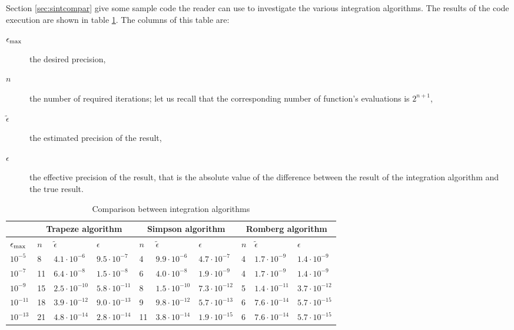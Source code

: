 \documentclass[twoside]{book}
\begin{document}
Section \ref{sec:sintcompar} give some sample code the reader can use to
investigate the various integration algorithms.
The results of the code execution are shown in table \ref{tb:intcompar}.
The columns of this table are:
\begin{description}
\item[$\epsilon_{\mathop{\rm max}}$]the desired precision,\\
\item[$n$]the number of required iterations; let us recall that the
corresponding number of function's evaluations is $2^{n+1}$,\\
\item[$\tilde{\epsilon}$]the estimated precision of the result,\\
\item[$\epsilon$]the effective precision of the result, that is the absolute value
of the difference between the result of the integration algorithm and the true result.\\
\end{description}

\begin{table}[h]
  \centering
  \caption{Comparison between integration algorithms}\label{tb:intcompar}
\vspace{1 ex}
\begin{tabular}{|l|l|l|l|l|l|l|l|l|l|} \hline
  &\multicolumn{3}{c|}{\bf Trapeze algorithm} &\multicolumn{3}{c|}{\bf Simpson algorithm}&\multicolumn{3}{c|}{\bf Romberg algorithm}  \\ \hline
  $\epsilon_{\mathop{\rm max}}$ & $n$ & $\tilde{\epsilon}$ & $\epsilon$ & $n$ & $\tilde{\epsilon}$ & $\epsilon$ & $n$ & $\tilde{\epsilon}$ & $\epsilon$
  \\ \hline
$10^{-5}$&8&$4.1\cdot 10^{-6}$&$9.5\cdot 10^{-7}$&4&$9.9\cdot
10^{-6}$&$4.7\cdot 10^{-7}$&4&$1.7\cdot 10^{-9}$&$1.4\cdot
10^{-9}$\\ \hline $10^{-7}$&11&$6.4\cdot 10^{-8}$&$1.5\cdot
10^{-8}$&6&$4.0\cdot 10^{-8}$&$1.9\cdot 10^{-9}$&4&$1.7\cdot
10^{-9}$&$1.4\cdot 10^{-9}$\\ \hline $10^{-9}$ &15&$2.5\cdot
10^{-10}$&$5.8\cdot 10^{-11}$&8&$1.5\cdot 10^{-10}$&$7.3\cdot
10^{-12}$&5&$1.4\cdot 10^{-11}$&$3.7\cdot 10^{-12}$\\ \hline
$10^{-11}$ &18&$3.9\cdot 10^{-12}$&$9.0\cdot 10^{-13}$&9&$9.8\cdot
10^{-12}$&$5.7\cdot 10^{-13}$&6&$7.6\cdot 10^{-14}$&$5.7\cdot
10^{-15}$\\ \hline $10^{-13}$&21&$4.8\cdot 10^{-14}$&$2.8\cdot
10^{-14}$&11&$3.8\cdot 10^{-14}$&$1.9\cdot 10^{-15}$&6&$7.6\cdot
10^{-14}$&$5.7\cdot 10^{-15}$\\ \hline
\end{tabular}
\end{table}
\end{document}

